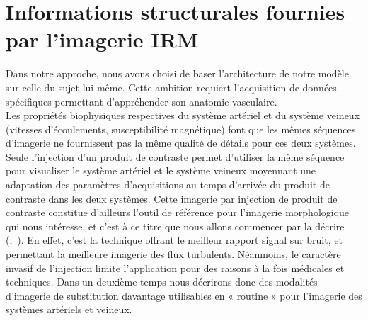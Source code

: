 \section{Informations structurales fournies par l'imagerie IRM}
Dans notre approche, nous avons choisi de baser l’architecture de notre modèle sur celle du sujet lui-même. Cette ambition requiert l’acquisition de données spécifiques permettant d’appréhender son anatomie vasculaire.\\
Les propriétés biophysiques respectives du système artériel et du système veineux (vitesses d’écoulements, susceptibilité magnétique) font que les mêmes séquences d’imagerie ne fournissent pas la même qualité de détails pour ces deux systèmes. Seule l’injection d’un produit de contraste permet d’utiliser la même séquence pour visualiser le système artériel et le système veineux moyennant une adaptation des paramètres d’acquisitions au temps d’arrivée du produit de contraste dans les deux systèmes. Cette imagerie par injection de produit de contraste constitue d’ailleurs l’outil de référence pour l’imagerie morphologique qui nous intéresse, et c’est à ce titre que nous allons commencer par la décrire (\cite{Takano1999},~\cite{Sohn2003}). En effet, c’est la technique offrant le meilleur rapport signal sur bruit, et permettant la meilleure imagerie des flux turbulents. Néanmoins, le caractère invasif de l’injection limite l’application pour des raisons à la fois médicales et techniques. Dans un deuxième temps nous décrirons donc des modalités d’imagerie de substitution davantage utilisables en « routine » pour l’imagerie des systèmes artériels et veineux.
